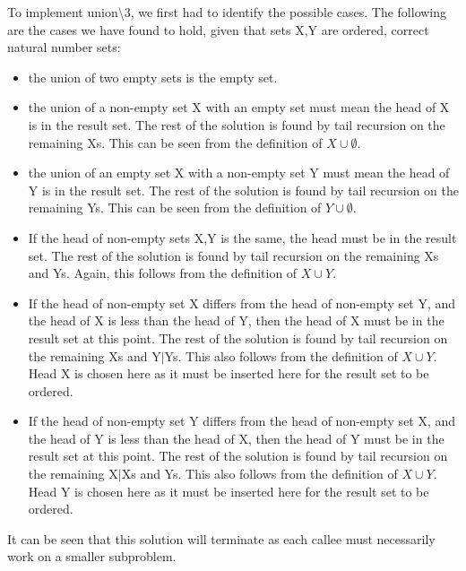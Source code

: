 \documentclass[]{article}
\begin{document}
To implement union\textbackslash3, we first had to identify the possible cases. The following are the cases we have found to hold, given that sets X,Y are ordered, correct natural number sets:

\begin{itemize}
	\item the union of two empty sets is the empty set.
	
	\item the union of a non-empty set X with an empty set must mean the head of X is in the result set. The rest of the solution is found by tail recursion on the remaining Xs. This can be seen from the definition of $X \cup \emptyset$.
	
	\item the union of an empty set X with a non-empty set Y must mean the head of Y is in the result set. The rest of the solution is found by tail recursion on the remaining Ys. This can be seen from the definition of $Y \cup \emptyset$.
	
	\item If the head of non-empty sets X,Y is the same, the head must be in the result set. The rest of the solution is found by tail recursion on the remaining Xs and Ys. Again, this follows from the definition of $X \cup Y$.
	
	\item If the head of non-empty set X differs from the head of non-empty set Y, and the head of X is less than the head of Y, then the head of X must be in the result set at this point. The rest of the solution is found by tail recursion on the remaining Xs and Y$|$Ys. This also follows from the definition of $X \cup Y$. Head X is chosen here as it must be inserted here for the result set to be ordered. 
	
	\item If the head of non-empty set Y differs from the head of non-empty set X, and the head of Y is less than the head of X, then the head of Y must be in the result set at this point. The rest of the solution is found by tail recursion on the remaining X$|$Xs and Ys. This also follows from the definition of $X \cup Y$. Head Y is chosen here as it must be inserted here for the result set to be ordered.  

\end{itemize}

It can be seen that this solution will terminate as each callee must necessarily work on a smaller subproblem.\par   
\end{document}
